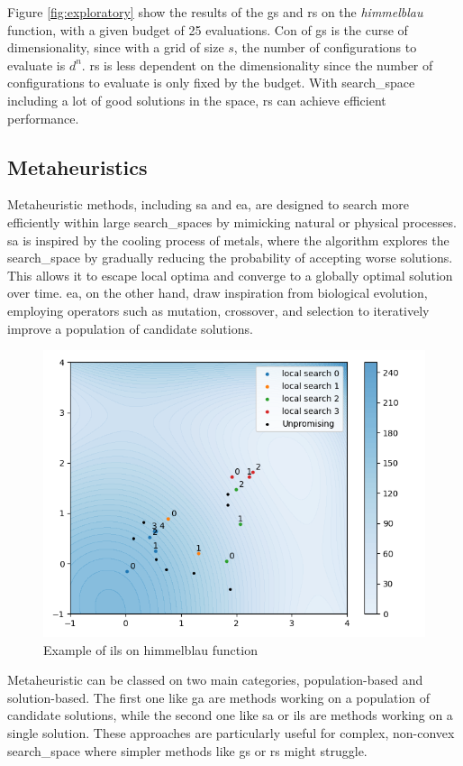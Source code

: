 Figure \ref{fig:exploratory} show the results of the \acrshort{gs} and \acrshort{rs} on the \textit{himmelblau} function, with a given budget of 25 evaluations. Con of \acrshort{gs} is the curse of dimensionality, since with a grid of size $s$, the number of configurations to evaluate is $d^n$. \acrshort{rs} is less dependent on the dimensionality since the number of configurations to evaluate is only fixed by the budget. With \gls{search_space} including a lot of good solutions in the space, \acrshort{rs} can achieve efficient performance.

\subsection{Metaheuristics} 
\label{sec:meta}  

Metaheuristic methods, including \acrfull{sa} and \acrfull{ea}, are designed to search more efficiently within large \glspl{search_space} by mimicking natural or physical processes. \acrshort{sa} is inspired by the cooling process of metals, where the algorithm explores the \gls{search_space} by gradually reducing the probability of accepting worse solutions. This allows it to escape local optima and converge to a globally optimal solution over time. \acrshort{ea}, on the other hand, draw inspiration from biological evolution, employing operators such as mutation, crossover, and selection to iteratively improve a population of candidate solutions.

\begin{figure}[h]
    \centering
    \includegraphics[width=0.4\linewidth]{assets/img/chap_2/plots/ils.png}
    \caption{Example of \acrfull{ils} on \gls{himmelblau} function}
    \label{fig:ils}
\end{figure}

Metaheuristic can be classed on two main categories, population-based and solution-based. The first one like \acrshort{ga} are methods working on a population of candidate solutions, while the second one like \acrshort{sa} or \acrfull{ils} are methods working on a single solution. These approaches are particularly useful for complex, non-convex \gls{search_space}  where simpler methods like \acrshort{gs} or \acrshort{rs} might struggle.



